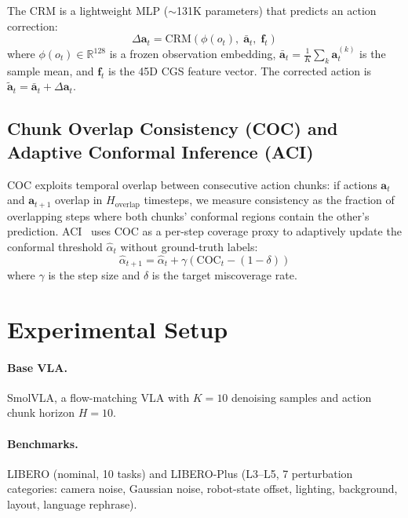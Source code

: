 \documentclass[letterpaper]{article}
\begin{document}
The CRM is a lightweight MLP ($\sim$131K parameters) that predicts an action correction:
\begin{equation}
    \Delta\mathbf{a}_t = \text{CRM}(\phi(o_t),\; \bar{\mathbf{a}}_t,\; \mathbf{f}_t)
\end{equation}
where $\phi(o_t) \in \mathbb{R}^{128}$ is a frozen observation embedding, $\bar{\mathbf{a}}_t = \frac{1}{K}\sum_k \mathbf{a}_t^{(k)}$ is the sample mean, and $\mathbf{f}_t$ is the 45D CGS feature vector.
The corrected action is $\tilde{\mathbf{a}}_t = \bar{\mathbf{a}}_t + \Delta\mathbf{a}_t$.

\subsection{Chunk Overlap Consistency (COC) and Adaptive Conformal Inference (ACI)}

COC exploits temporal overlap between consecutive action chunks: if actions $\mathbf{a}_{t}$ and $\mathbf{a}_{t+1}$ overlap in $H_{\text{overlap}}$ timesteps, we measure consistency as the fraction of overlapping steps where both chunks' conformal regions contain the other's prediction.
ACI~\citep{gibbs2021adaptive} uses COC as a per-step coverage proxy to adaptively update the conformal threshold $\hat{\alpha}_t$ without ground-truth labels:
\begin{equation}
    \hat{\alpha}_{t+1} = \hat{\alpha}_t + \gamma(\text{COC}_t - (1-\delta))
\end{equation}
where $\gamma$ is the step size and $\delta$ is the target miscoverage rate.

\section{Experimental Setup}

\paragraph{Base VLA.} SmolVLA, a flow-matching VLA with $K{=}10$ denoising samples and action chunk horizon $H{=}10$.

\paragraph{Benchmarks.} LIBERO (nominal, 10 tasks) and LIBERO-Plus (L3--L5, 7 perturbation categories: camera noise, Gaussian noise, robot-state offset, lighting, background, layout, language rephrase).
\end{document}
